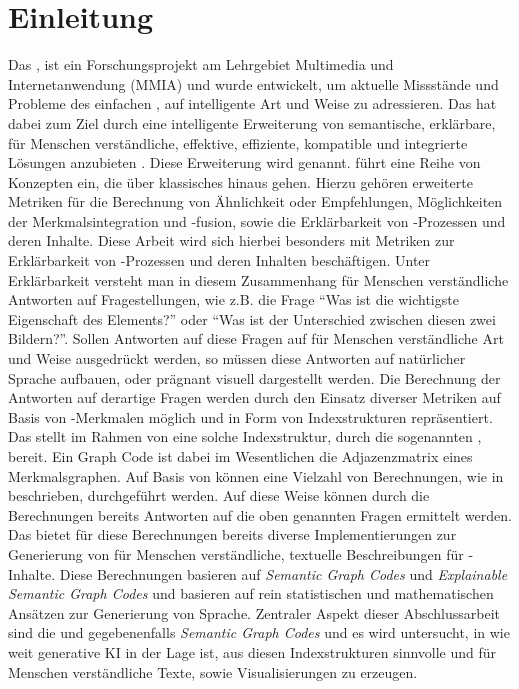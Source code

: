 \section{Einleitung}
\label{sec1:intro}
Das \gmafi{} \cite{gmaf_github, gmaf_website}, ist ein Forschungsprojekt am Lehrgebiet Multimedia und Internetanwendung (MMIA) und wurde entwickelt, um aktuelle Missstände und Probleme des einfachen \mmiri{}, auf intelligente Art und Weise zu adressieren. 
Das \gmaf{} hat dabei zum Ziel durch eine intelligente Erweiterung von \mmir{} semantische, erklärbare, für Menschen verständliche, effektive, effiziente, kompatible und integrierte Lösungen anzubieten \cite[S.~20]{swa_diss}. 
Diese Erweiterung wird \smmiri{} genannt. 
\smmir{} führt eine Reihe von Konzepten ein, die über klassisches \mmir{} hinaus gehen. 
Hierzu gehören erweiterte Metriken für die Berechnung von Ähnlichkeit oder Empfehlungen, Möglichkeiten der Merkmalsintegration und -fusion, sowie die Erklärbarkeit von \mmir{}-Prozessen und deren Inhalte. 
Diese Arbeit wird sich hierbei besonders mit Metriken zur Erklärbarkeit von \mmir{}-Prozessen und deren Inhalten beschäftigen.
\med
Unter Erklärbarkeit versteht man in diesem Zusammenhang für Menschen verständliche Antworten auf Fragestellungen, wie z.B. die Frage \enquote{Was ist die wichtigste Eigenschaft des Elements?} oder \enquote{Was ist der Unterschied zwischen diesen zwei Bildern?}.
Sollen Antworten auf diese Fragen auf für Menschen verständliche Art und Weise ausgedrückt werden, so müssen diese Antworten auf natürlicher Sprache aufbauen, oder prägnant visuell dargestellt werden.
Die Berechnung der Antworten auf derartige Fragen werden durch den Einsatz diverser Metriken auf Basis von \mmir{}-Merkmalen möglich und in Form von Indexstrukturen repräsentiert. 
Das \gmaf{} stellt im Rahmen von \smmir{} eine solche Indexstruktur, durch die sogenannten \gcs{} \cite{fast-effec-retr-large-collec}, bereit.
Ein Graph Code ist dabei im Wesentlichen die Adjazenzmatrix eines Merkmalsgraphen. 
Auf Basis von \gcs{} können eine Vielzahl von Berechnungen, wie in \cite{towards_auto_sem_expl_mmfg} beschrieben, durchgeführt werden. 
Auf diese Weise können durch die Berechnungen bereits Antworten auf die oben genannten Fragen ermittelt werden.
Das \gmaf{} bietet für diese Berechnungen bereits diverse Implementierungen zur Generierung von für Menschen verständliche, textuelle Beschreibungen für \mmir{}-Inhalte.
Diese Berechnungen basieren auf \textit{Semantic Graph Codes} und \textit{Explainable Semantic Graph Codes} und basieren auf rein statistischen und mathematischen Ansätzen zur Generierung von Sprache.
\med
Zentraler Aspekt dieser Abschlussarbeit sind die \gcs{} und gegebenenfalls \textit{Semantic Graph Codes} und es wird untersucht, in wie weit generative KI in der Lage ist, aus diesen Indexstrukturen sinnvolle und für Menschen verständliche Texte, sowie Visualisierungen zu erzeugen.

